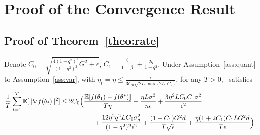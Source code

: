 \documentclass[11pt]{article}
\begin{document}
\section{Proof of the Convergence Result}\label{app:proof}


\subsection{Proof of Theorem~\ref{theo:rate}}\label{app:thm}

\begin{Theorem*}
Denote $C_0=\sqrt{\frac{4(1+q^2)^3}{(1-q^2)^2}G^2+\epsilon}$, $C_1=\frac{\beta_1}{1-\beta_1}+\frac{2q}{1-q^2}$. Under Assumption~\ref{ass:quant} to Assumption~\ref{ass:var}, with $\eta_t=\eta\leq \frac{\epsilon}{3C_0\sqrt{2L \max\{2L,C_2\}}}$, for any $T >0$, \algo\ satisfies
\begin{align*}
    \frac{1}{T}\sum_{t=1}^T \mathbb E[\|\nabla f(\theta_t)\|^2]
    &\leq 2C_0\Big(\frac{\mathbb E[f(\theta_1)-f(\theta^*)]}{T\eta}+\frac{\eta L \sigma^2}{n\epsilon}+\frac{3\eta^2 LC_0C_1\sigma^2}{\epsilon^2}  \\
    &\hspace{0.7in} + \frac{12\eta^2q^2LC_0\sigma_g^2}{(1-q^2)^2\epsilon^2}+\frac{ (1+C_1)G^2d}{T\sqrt\epsilon}+\frac{\eta (1+2C_1)C_1LG^2d}{T\epsilon} \Big).
\end{align*}
\end{Theorem*}
\end{document}
